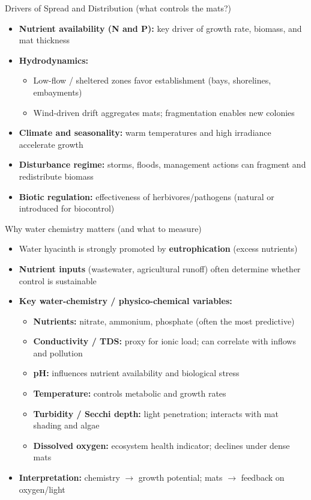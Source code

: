 \begin{frame}{Drivers of Spread and Distribution (what controls the mats?)}
\begin{itemize}
  \item \textbf{Nutrient availability (N and P):} key driver of growth rate, biomass, and mat thickness
  \item \textbf{Hydrodynamics:}
    \begin{itemize}
      \item Low-flow / sheltered zones favor establishment (bays, shorelines, embayments)
      \item Wind-driven drift aggregates mats; fragmentation enables new colonies
    \end{itemize}
  \item \textbf{Climate and seasonality:} warm temperatures and high irradiance accelerate growth
  \item \textbf{Disturbance regime:} storms, floods, management actions can fragment and redistribute biomass
  \item \textbf{Biotic regulation:} effectiveness of herbivores/pathogens (natural or introduced for biocontrol)
\end{itemize}
\end{frame}

\begin{frame}{Why water chemistry matters (and what to measure)}
\begin{itemize}
  \item Water hyacinth is strongly promoted by \textbf{eutrophication} (excess nutrients)
  \item \textbf{Nutrient inputs} (wastewater, agricultural runoff) often determine whether control is sustainable
  \item \textbf{Key water-chemistry / physico-chemical variables:}
    \begin{itemize}
      \item \textbf{Nutrients:} nitrate, ammonium, phosphate (often the most predictive)
      \item \textbf{Conductivity / TDS:} proxy for ionic load; can correlate with inflows and pollution
      \item \textbf{pH:} influences nutrient availability and biological stress
      \item \textbf{Temperature:} controls metabolic and growth rates
      \item \textbf{Turbidity / Secchi depth:} light penetration; interacts with mat shading and algae
      \item \textbf{Dissolved oxygen:} ecosystem health indicator; declines under dense mats
    \end{itemize}
  \item \textbf{Interpretation:} chemistry $\rightarrow$ growth potential; mats $\rightarrow$ feedback on oxygen/light
\end{itemize}
\end{frame}

